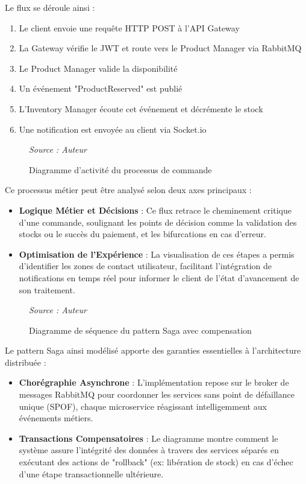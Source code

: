 Le flux se déroule ainsi :
\begin{enumerate}
    \item Le client envoie une requête HTTP POST à l'API Gateway
    \item La Gateway vérifie le JWT et route vers le Product Manager via RabbitMQ
    \item Le Product Manager valide la disponibilité
    \item Un événement "ProductReserved" est publié
    \item L'Inventory Manager écoute cet événement et décrémente le stock
    \item Une notification est envoyée au client via Socket.io
\end{enumerate}

\begin{figure}[H]
    \centering
    
    \caption{Diagramme d'activité du processus de commande}
    \vspace{0.2cm}\small\textit{Source : Auteur}
    \label{fig:activity_order}
\end{figure}

Ce processus métier peut être analysé selon deux axes principaux :
\begin{itemize}
    \item \textbf{Logique Métier et Décisions} : Ce flux retrace le cheminement critique d'une commande, soulignant les points de décision comme la validation des stocks ou le succès du paiement, et les bifurcations en cas d'erreur.
    \item \textbf{Optimisation de l'Expérience} : La visualisation de ces étapes a permis d'identifier les zones de contact utilisateur, facilitant l'intégration de notifications en temps réel pour informer le client de l'état d'avancement de son traitement.
\end{itemize}


\begin{figure}[H]
    \centering
    
    \caption{Diagramme de séquence du pattern Saga avec compensation}
    \vspace{0.2cm}\small\textit{Source : Auteur}
    \label{fig:sequence_saga}
\end{figure}

Le pattern Saga ainsi modélisé apporte des garanties essentielles à l'architecture distribuée :
\begin{itemize}
    \item \textbf{Chorégraphie Asynchrone} : L'implémentation repose sur le broker de messages RabbitMQ pour coordonner les services sans point de défaillance unique (SPOF), chaque microservice réagissant intelligemment aux événements métiers.
    \item \textbf{Transactions Compensatoires} : Le diagramme montre comment le système assure l'intégrité des données à travers des services séparés en exécutant des actions de "rollback" (ex: libération de stock) en cas d'échec d'une étape transactionnelle ultérieure.
\end{itemize}



